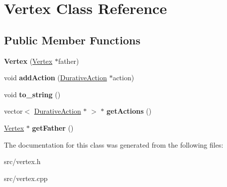 \hypertarget{classVertex}{\section{Vertex Class Reference}
\label{classVertex}
}
\subsection*{Public Member Functions}
\begin{DoxyCompactItemize}
\item 
\hypertarget{classVertex_a7ab79d72fd7da5b17ad2a96687f28330}{{\bfseries Vertex} (\hyperlink{classVertex}{Vertex} $\ast$father)}\label{classVertex_a7ab79d72fd7da5b17ad2a96687f28330}

\item 
\hypertarget{classVertex_ae7d9984499c01b2c04fd16a2e2bc6d23}{void {\bfseries add\+Action} (\hyperlink{classDurativeAction}{Durative\+Action} $\ast$action)}\label{classVertex_ae7d9984499c01b2c04fd16a2e2bc6d23}

\item 
\hypertarget{classVertex_a699b688b71b89946ee95177d9764730d}{void {\bfseries to\+\_\+string} ()}\label{classVertex_a699b688b71b89946ee95177d9764730d}

\item 
\hypertarget{classVertex_a6046d6709f420cd4cfa70f8ec0198a42}{vector$<$ \hyperlink{classDurativeAction}{Durative\+Action} $\ast$ $>$ $\ast$ {\bfseries get\+Actions} ()}\label{classVertex_a6046d6709f420cd4cfa70f8ec0198a42}

\item 
\hypertarget{classVertex_a8c56826133130f0fe0438ca066b8d35d}{\hyperlink{classVertex}{Vertex} $\ast$ {\bfseries get\+Father} ()}\label{classVertex_a8c56826133130f0fe0438ca066b8d35d}

\end{DoxyCompactItemize}


The documentation for this class was generated from the following files\+:\begin{DoxyCompactItemize}
\item 
src/vertex.\+h\item 
src/vertex.\+cpp\end{DoxyCompactItemize}
